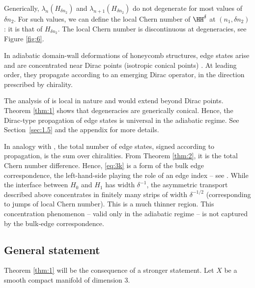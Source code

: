 Generically, $\lambda_n(H_{\delta n_2})$ and $\lambda_{n+1}(H_{\delta n_2})$ do not degenerate for most values of $\delta n_2$. For such values, we can define the local Chern number of $\HH^\delta$ at $(n_1,\delta n_2)$: it is that of $H_{\delta n_2}$. The local Chern number is discontinuous at degeneracies, see Figure \ref{fig:6}.

In adiabatic domain-wall deformations of honeycomb structures, edge states arise and are concentrated near Dirac points (isotropic conical points) \cite{FLW16,LWZ17,D19a,DW19}. At leading order, they propagate according to an emerging Dirac operator, in the direction prescribed by chirality.

The analysis of \cite{FLW16,LWZ17,D19a,DW19} is local in nature and would extend beyond Dirac points. Theorem \ref{thm:1} shows that degeneracies are generically conical. Hence, the Dirac-type propagation of edge states is universal in the adiabatic regime. See Section~\ref{sec:1.5} and the appendix for more details.

In analogy with \cite{D19a,D19b,DW19}, the total number of edge states, signed according to propagation, is the sum over chiralities. From Theorem \ref{thm:2}, it is the total Chern number difference. Hence, \eqref{eq:3k} is a form of the bulk edge correspondence, the left-hand-side playing the role of an edge index -- see \cite{H93,KRS02,EGS05,ASV13,GP13,PS16,BKR17,D19c}. While the interface between $H_0$ and $H_1$ has width $\delta^{-1}$, the asymmetric transport described above concentrates in finitely many strips of width $\delta^{-1/2}$ (corresponding to jumps of local Chern number). This is a much thinner region. This concentration phenomenon -- valid only in the adiabatic regime -- is not captured by the bulk-edge correspondence.

\subsection{General statement}\label{sec:1.4} Theorem \ref{thm:1} will be the consequence of a stronger statement. Let $X$ be a smooth compact manifold of dimension 3.

